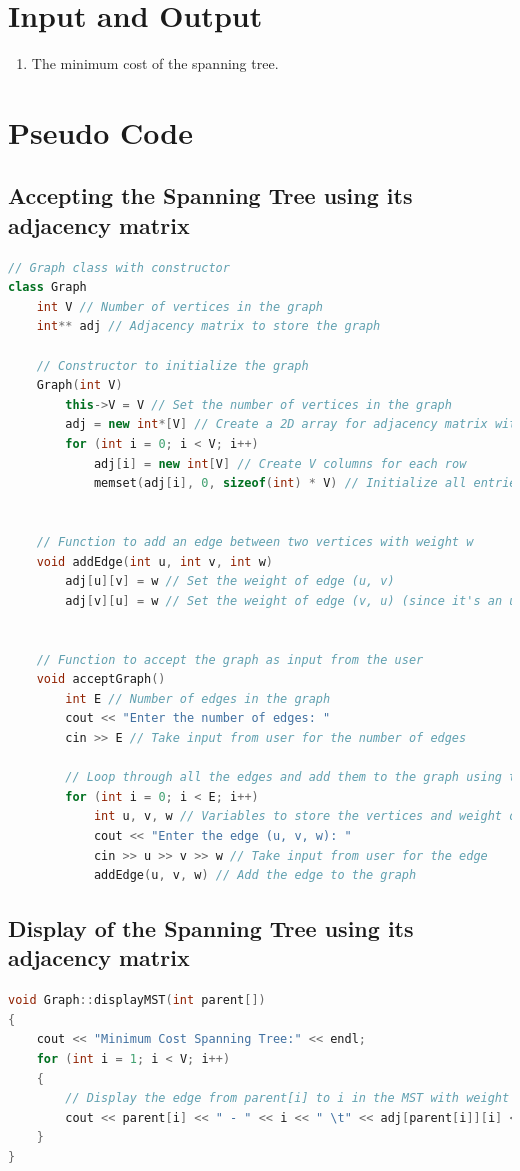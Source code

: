 \documentclass[11pt]{article}
\begin{document}
\section{Input and Output}
\begin{enumerate}
    \item The minimum cost of the spanning tree.
\end{enumerate}

\section{Pseudo Code}
\subsection{Accepting the Spanning Tree using its adjacency matrix}
\begin{lstlisting}[language=C++]
// Graph class with constructor
class Graph
    int V // Number of vertices in the graph
    int** adj // Adjacency matrix to store the graph
    
    // Constructor to initialize the graph
    Graph(int V)
        this->V = V // Set the number of vertices in the graph
        adj = new int*[V] // Create a 2D array for adjacency matrix with V rows
        for (int i = 0; i < V; i++)
            adj[i] = new int[V] // Create V columns for each row
            memset(adj[i], 0, sizeof(int) * V) // Initialize all entries in the matrix to 0
    

    // Function to add an edge between two vertices with weight w
    void addEdge(int u, int v, int w)
        adj[u][v] = w // Set the weight of edge (u, v)
        adj[v][u] = w // Set the weight of edge (v, u) (since it's an undirected graph)
    

    // Function to accept the graph as input from the user
    void acceptGraph()
        int E // Number of edges in the graph
        cout << "Enter the number of edges: "
        cin >> E // Take input from user for the number of edges

        // Loop through all the edges and add them to the graph using the addEdge function
        for (int i = 0; i < E; i++)
            int u, v, w // Variables to store the vertices and weight of the edge
            cout << "Enter the edge (u, v, w): "
            cin >> u >> v >> w // Take input from user for the edge
            addEdge(u, v, w) // Add the edge to the graph

\end{lstlisting}
\subsection{Display of the Spanning Tree using its adjacency matrix}
\begin{lstlisting}[language=C++]
void Graph::displayMST(int parent[])
{
    cout << "Minimum Cost Spanning Tree:" << endl;
    for (int i = 1; i < V; i++)
    {
        // Display the edge from parent[i] to i in the MST with weight adj[parent[i]][i]
        cout << parent[i] << " - " << i << " \t" << adj[parent[i]][i] << endl;
    }
}
\end{lstlisting}
\end{document}
